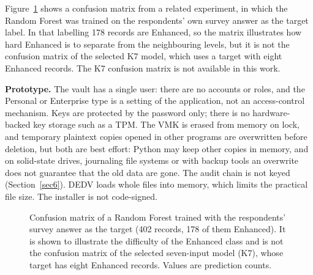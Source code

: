 \documentclass[pdflatex,sn-mathphys-num]{sn-jnl}
\begin{document}
Figure~\ref{fig6} shows a confusion matrix from a related experiment, in which the Random Forest
was trained on the respondents' own survey answer as the target label. In that labelling 178
records are Enhanced, so the matrix illustrates how hard Enhanced is to separate from the
neighbouring levels, but it is not the confusion matrix of the selected K7 model, which uses a
target with eight Enhanced records. The K7 confusion matrix is not available in this work.

\textbf{Prototype.} The vault has a single user: there are no accounts or roles, and the Personal
or Enterprise type is a setting of the application, not an access-control mechanism. Keys are
protected by the password only; there is no hardware-backed key storage such as a TPM. The VMK is
erased from memory on lock, and temporary plaintext copies opened in other programs are
overwritten before deletion, but both are best effort: Python may keep other copies in memory, and
on solid-state drives, journaling file systems or with backup tools an overwrite does not
guarantee that the old data are gone. The audit chain is not keyed (Section~\ref{sec6}). DEDV
loads whole files into memory, which limits the practical file size. The installer is not
code-signed.

\begin{figure}[h]
\centering
{}
\caption{Confusion matrix of a Random Forest trained with the respondents' survey answer as the
target (402 records, 178 of them Enhanced). It is shown to illustrate the difficulty of the
Enhanced class and is not the confusion matrix of the selected seven-input model (K7), whose
target has eight Enhanced records. Values are prediction counts.}\label{fig6}
\end{figure}
\end{document}
